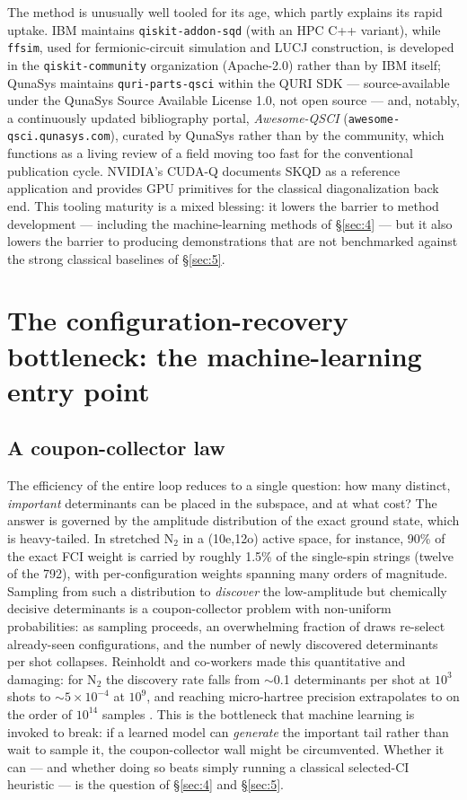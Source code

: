\documentclass[onecolumn,a4paper]{quantumarticle}
\begin{document}
The method is unusually well tooled for its age, which partly explains its rapid uptake. IBM maintains \texttt{qiskit-addon-sqd} (with an HPC C++ variant), while \texttt{ffsim}, used for fermionic-circuit simulation and LUCJ construction, is developed in the \texttt{qiskit-community} organization (Apache-2.0) rather than by IBM itself; QunaSys maintains \texttt{quri-parts-qsci} within the QURI SDK --- source-available under the QunaSys Source Available License 1.0, not open source --- and, notably, a continuously updated bibliography portal, \emph{Awesome-QSCI} (\texttt{awesome-qsci.qunasys.com}), curated by QunaSys rather than by the community, which functions as a living review of a field moving too fast for the conventional publication cycle. NVIDIA's CUDA-Q documents SKQD as a reference application and provides GPU primitives for the classical diagonalization back end. This tooling maturity is a mixed blessing: it lowers the barrier to method development --- including the machine-learning methods of \S\ref{sec:4} --- but it also lowers the barrier to producing demonstrations that are not benchmarked against the strong classical baselines of \S\ref{sec:5}.


\section{The configuration-recovery bottleneck: the machine-learning entry point}\label{sec:3}


\subsection{A coupon-collector law}\label{sec:3-1}

The efficiency of the entire loop reduces to a single question: how many distinct, \emph{important} determinants can be placed in the subspace, and at what cost? The answer is governed by the amplitude distribution of the exact ground state, which is heavy-tailed. In stretched N$_2$ in a (10e,12o) active space, for instance, 90\% of the exact FCI weight is carried by roughly 1.5\% of the single-spin strings (twelve of the 792), with per-configuration weights spanning many orders of magnitude. Sampling from such a distribution to \emph{discover} the low-amplitude but chemically decisive determinants is a coupon-collector problem with non-uniform probabilities: as sampling proceeds, an overwhelming fraction of draws re-select already-seen configurations, and the number of newly discovered determinants per shot collapses. Reinholdt and co-workers made this quantitative and damaging: for N$_2$ the discovery rate falls from $\sim$0.1 determinants per shot at $10^3$ shots to $\sim\!5\times10^{-4}$ at $10^9$, and reaching micro-hartree precision extrapolates to on the order of $10^{14}$ samples \cite{reinholdt2025}. This is the bottleneck that machine learning is invoked to break: if a learned model can \emph{generate} the important tail rather than wait to sample it, the coupon-collector wall might be circumvented. Whether it can --- and whether doing so beats simply running a classical selected-CI heuristic --- is the question of \S\ref{sec:4} and \S\ref{sec:5}.
\end{document}
